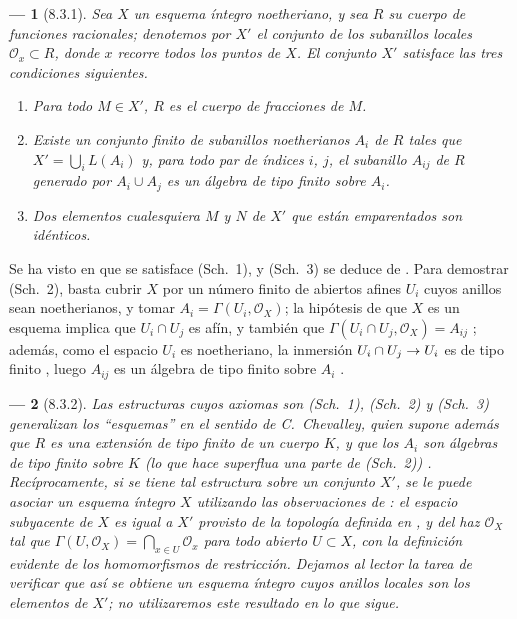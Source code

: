 \documentclass[oneside]{amsart}
\theoremstyle{ega-env-style}
\newtheorem*{env}{---}
\theoremstyle{ega-thm-env-style}
\theoremstyle{ega-defn-env-style}
\renewcommand{\to}{\mathchoice{\longrightarrow}{\rightarrow}{\rightarrow}{\rightarrow}}
\newcommand{\oldpage}[2][]{{\marginnote{\normalfont{\textbf{#1}~|~#2}}}\ignorespaces}
\let\EGAOriginalLabel\label
\renewcommand{\label}[1]{\phantomsection\EGAOriginalLabel{#1}}
\begin{document}
\begin{env}[8.3.1]
\label{I.8.3.1}
Sea $X$ un esquema íntegro \emph{noetheriano}, y sea $R$ su cuerpo de funciones racionales;
denotemos por $X'$ el conjunto de los subanillos locales $\mathscr{O}_x\subset R$, donde $x$ recorre todos los puntos de $X$.
El conjunto $X'$ satisface las tres condiciones siguientes.
\begin{enumerate}
  \item[(Sch.~1)] \emph{Para todo $M\in X'$, $R$ es el cuerpo de fracciones de $M$.}
  \item[(Sch.~2)] \emph{Existe un conjunto finito de subanillos noetherianos $A_i$ de $R$ tales que $X'=\bigcup_i L(A_i)$ y, para todo par de índices $i$, $j$, el subanillo $A_{ij}$ de $R$ generado por $A_i\cup A_j$ es un álgebra de tipo finito sobre $A_i$.}
  \item[(Sch.~3)] \emph{Dos elementos cualesquiera $M$ y $N$ de $X'$ que están emparentados son idénticos.}
\end{enumerate}
\end{env}

Se ha visto en  que se satisface (Sch.~1), y (Sch.~3) se deduce de .
Para demostrar (Sch.~2), basta cubrir $X$ por un número finito de abiertos afines $U_i$ cuyos anillos sean noetherianos, y tomar $A_i=\Gamma(U_i,\mathscr{O}_X)$;
la hipótesis de que $X$ es un esquema implica que $U_i\cap U_j$ es afín, y también que $\Gamma(U_i\cap U_j,\mathscr{O}_X)=A_{ij}$ ;
además, como el espacio $U_i$ es noetheriano, la inmersión $U_i\cap U_j\to U_i$ es de tipo finito , luego $A_{ij}$ es un álgebra de tipo finito sobre $A_i$ .

\begin{env}[8.3.2]
\label{I.8.3.2}
Las estructuras cuyos axiomas son (Sch.~1), (Sch.~2) y (Sch.~3) generalizan los ``esquemas'' en el sentido de C.~Chevalley, quien supone además que $R$ es una extensión de tipo finito de un cuerpo $K$, y que los $A_i$ son álgebras de tipo finito sobre $K$ (lo que hace superflua una parte de (Sch.~2)) \cite{I-1}.
Recíprocamente, si se tiene tal estructura sobre un conjunto $X'$, se le puede asociar un esquema íntegro $X$ utilizando las observaciones de : el espacio subyacente de $X$ es igual a $X'$ provisto de la topología definida en , y del haz $\mathscr{O}_X$
\oldpage[I]{169}
tal que $\Gamma(U,\mathscr{O}_X)=\bigcap_{x\in U}\mathscr{O}_x$ para todo abierto $U\subset X$, con la definición evidente de los homomorfismos de restricción.
Dejamos al lector la tarea de verificar que así se obtiene un esquema íntegro cuyos anillos locales son los elementos de $X'$;
no utilizaremos este resultado en lo que sigue.
\end{env}
\end{document}
